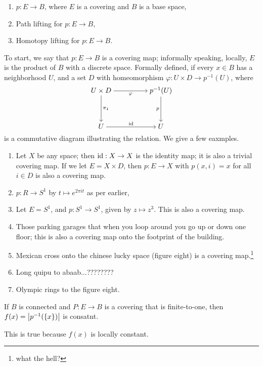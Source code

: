 \begin{enumerate}[label=(\alph*)]
    \item $p : E \to B$, where $E$ is a covering and $B$ is a base space,
    \item Path lifting for $p : E \to B$,
    \item Homotopy lifting for $p : E \to B$.
\end{enumerate}
To start, we say that $p : E \to B$ is a covering map; informally speaking, locally, $E$ is the product of $B$ with a discrete space. Formally defined, if every $x \in B$ has a neighborhood $U$, and a set $D$ with homeomorphism $\varphi : U \times D \to p^{-1}(U)$, where
\[\begin{tikzcd}[ampersand replacement=\&,cramped]
	{U \times D} \&\& {p^{-1}(U)} \\
	\\
	U \&\& U
	\arrow["\varphi"', from=1-1, to=1-3]
	\arrow["{\pi_1}", from=1-1, to=3-1]
	\arrow["p"', from=1-3, to=3-3]
	\arrow["\id", from=3-1, to=3-3]
\end{tikzcd}\]
is a commutative diagram illustrating the relation. We give a few eaxmples.
\begin{enumerate}[label=(\alph*)]
    \item Let $X$ be any space; then $\mathrm{id} : X \to X$ is the identity map; it is also a trivial covering map. If we let $E = X \times D$, then $p : E \to X$ with $p(x, i) = x$ for all $i \in D$ is also a covering map.
    \item $p : R \to S^1$ by $t \mapsto e^{2 \pi i t}$ as per earlier,
    \item Let $E = S^1$, and $p : S^1 \to S^1$, given by $z \mapsto z^3$. This is also a covering map.
    \item Those parking garages that when you loop around you go up or down one floor; this is also a covering map onto the footprint of the building.
    \item Mexican cross onto the chinese lucky space (figure eight) is a covering map.\footnote{what the hell?}
    \item Long quipu to abaab...????????
    \item Olympic rings to the figure eight.
\end{enumerate}
\begin{simpleclaim}
    If $B$ is connected and $P : E \to B$ is a covering that is finite-to-one, then $f(x) = \left\lvert p^{-1}(\{x\}) \right\rvert$ is consatnt.
\end{simpleclaim}
\noindent This is true because $f(x)$ is locally constant.